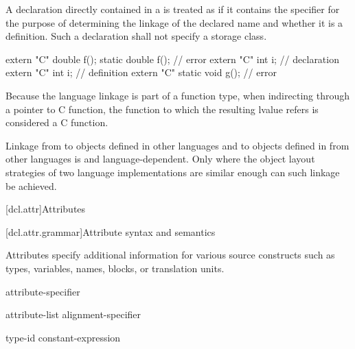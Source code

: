 \pnum
A declaration directly contained in a
is treated as if it contains the
specifier for the purpose of determining the linkage of the
declared name and whether it is a definition. Such a declaration shall
not specify a storage class.
\begin{example}
\begin{codeblock}
extern "C" double f();
static double f();                  // error
extern "C" int i;                   // declaration
extern "C" {
  int i;                            // definition
}
extern "C" static void g();         // error
\end{codeblock}
\end{example}

\pnum
\begin{note}
Because the language linkage is part of a function type, when
indirecting through a pointer to C function, the function to
which the resulting lvalue refers is considered a C function.
\end{note}

\pnum
{}%
%
Linkage from \Cpp{} to objects defined in other languages and to objects
defined in \Cpp{} from other languages is  and
language-dependent. Only where the object layout strategies of two
language implementations are similar enough can such linkage be
achieved.%

[dcl.attr]{Attributes}%

[dcl.attr.grammar]{Attribute syntax and semantics}

\pnum
{}%
Attributes specify additional information for various source constructs
such as types, variables, names, blocks, or translation units.

\begin{bnf}
\br
   attribute-specifier
\end{bnf}

\begin{bnf}
\br
  \terminal{[} \terminal{[}  attribute-list \terminal{]} \terminal{]}\br
  alignment-specifier
\end{bnf}

\begin{bnf}
\br
   \terminal{(} type-id  \terminal{)}\br
   \terminal{(} constant-expression  \terminal{)}
\end{bnf}

